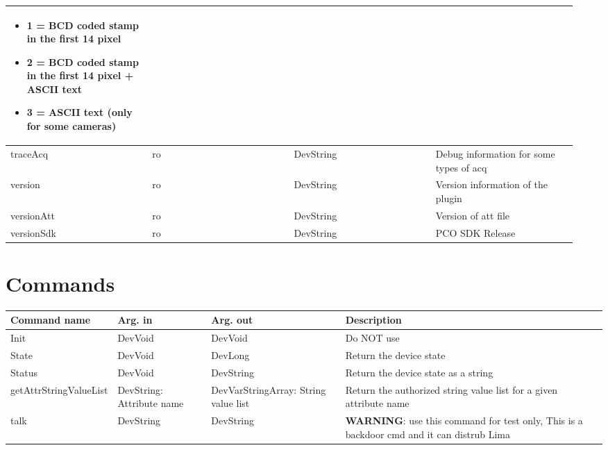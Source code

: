 \documentclass[letterpaper,10pt,english]{sphinxmanual}
\begin{document}
\begin{longtable}{|p{0.237\linewidth}|p{0.237\linewidth}|p{0.237\linewidth}|p{0.237\linewidth}|}
\begin{description}
\begin{itemize}
\item {} 
1 = BCD coded stamp in the first 14 pixel

\item {} 
2 = BCD coded stamp in the first 14 pixel + ASCII text

\item {} 
3 = ASCII text (\textbf{only for some cameras})

\end{itemize}

\end{description}
\\
\hline
traceAcq
 & 
ro
 & 
DevString
 & 
Debug information for some types of acq
\\
\hline
version
 & 
ro
 & 
DevString
 & 
Version information of the plugin
\\
\hline
versionAtt
 & 
ro
 & 
DevString
 & 
Version of att file
\\
\hline
versionSdk
 & 
ro
 & 
DevString
 & 
PCO SDK Release
\\
\hline\end{longtable}



\section{Commands}
\label{Pco/pco:commands}
\begin{tabulary}{\linewidth}{|L|L|L|L|}
\hline
\textsf{\relax 
Command name
} & \textsf{\relax 
Arg. in
} & \textsf{\relax 
Arg. out
} & \textsf{\relax 
Description
}\\
\hline
Init
 & 
DevVoid
 & 
DevVoid
 & 
Do NOT use
\\
\hline
State
 & 
DevVoid
 & 
DevLong
 & 
Return the device state
\\
\hline
Status
 & 
DevVoid
 & 
DevString
 & 
Return the device state as a string
\\
\hline
getAttrStringValueList
 & 
DevString:
Attribute name
 & 
DevVarStringArray:
String value list
 & 
Return the authorized string value list for
a given attribute name
\\
\hline
talk
 & 
DevString
 & 
DevString
 & 
\textbf{WARNING}: use this command for test only,
This is a backdoor cmd and it can distrub Lima
\\
\hline\end{tabulary}




\renewcommand{\indexname}{Index}
\printindex
\end{document}
